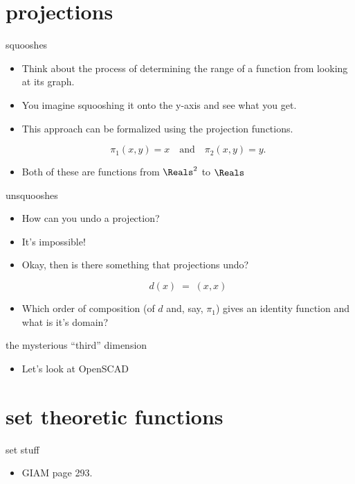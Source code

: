 \documentclass[handout,landscape]{beamer}
\begin{document}
\section{projections}

\begin{frame}{squooshes}
	\begin{itemize}
		\item Think about the process of determining the range of a function from looking at its graph. \pause
		\item You imagine squooshing it onto the y-axis and see what you get. \pause
		\item This approach can be formalized using the projection functions. \pause
		
		\[  \pi_1 (x,y) = x \quad \mbox{and} \quad \pi_2(x,y) = y. \] \pause
		
		\item Both of these are functions from $\Reals^2$ to $\Reals$
	\end{itemize}
\end{frame}

\begin{frame}{unsquooshes}
	\begin{itemize}
		\item How can you undo a projection?  \pause
		\item It's impossible! \pause
		\item Okay, then is there something that projections undo? \pause
		
		\[  d(x) \; = \; (x,x)  \] \pause
		
		\item Which order of composition (of $d$ and, say, $\pi_1$) gives an identity function and what is it's domain?
	\end{itemize}
\end{frame}

\begin{frame}{the mysterious ``third'' dimension}
	\begin{itemize}
		\item Let's look at OpenSCAD
	\end{itemize}
\end{frame}

\section{set theoretic functions}

\begin{frame}{set stuff}
	\begin{itemize}
		\item GIAM page 293.
	\end{itemize}
\end{frame}
\end{document}
